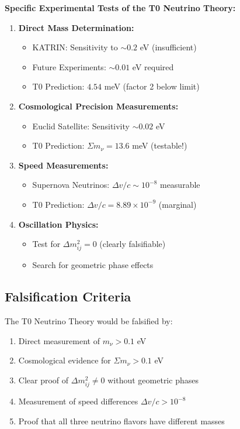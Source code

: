 \documentclass[12pt,a4paper]{article}
\begin{document}
	\begin{experimental}
		\textbf{Specific Experimental Tests of the T0 Neutrino Theory:}
		
		\begin{enumerate}
			\item \textbf{Direct Mass Determination:}
			\begin{itemize}
				\item KATRIN: Sensitivity to $\sim 0.2$ eV (insufficient)
				\item Future Experiments: $\sim 0.01$ eV required
				\item T0 Prediction: $4.54$ meV (factor 2 below limit)
			\end{itemize}
			
			\item \textbf{Cosmological Precision Measurements:}
			\begin{itemize}
				\item Euclid Satellite: Sensitivity $\sim 0.02$ eV
				\item T0 Prediction: $\Sigma m_\nu = 13.6$ meV (testable!)
			\end{itemize}
			
			\item \textbf{Speed Measurements:}
			\begin{itemize}
				\item Supernova Neutrinos: $\Delta v/c \sim 10^{-8}$ measurable
				\item T0 Prediction: $\Delta v/c = 8.89 \times 10^{-9}$ (marginal)
			\end{itemize}
			
			\item \textbf{Oscillation Physics:}
			\begin{itemize}
				\item Test for $\Delta m^2_{ij} = 0$ (clearly falsifiable)
				\item Search for geometric phase effects
			\end{itemize}
		\end{enumerate}
	\end{experimental}
	
	\subsection{Falsification Criteria}
	
	The T0 Neutrino Theory would be falsified by:
	\begin{enumerate}
		\item Direct measurement of $m_\nu > 0.1$ eV
		\item Cosmological evidence for $\Sigma m_\nu > 0.1$ eV
		\item Clear proof of $\Delta m^2_{ij} \neq 0$ without geometric phases
		\item Measurement of speed differences $\Delta v/c > 10^{-8}$
		\item Proof that all three neutrino flavors have different masses
	\end{enumerate}
	
\end{document}
